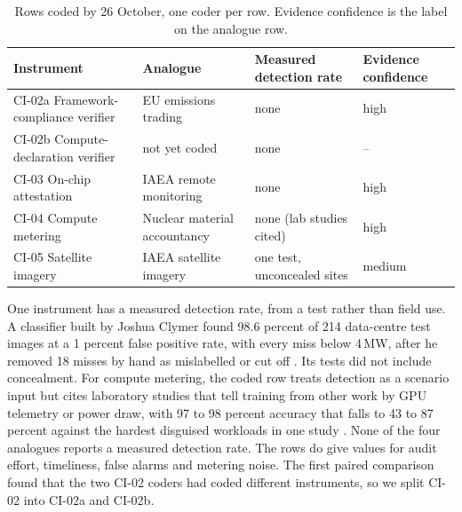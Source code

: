 \documentclass[11pt,a4paper]{article}
\begin{document}
\begin{table}[h]
\centering
\footnotesize
\begin{tabular}{@{}>{\raggedright\arraybackslash}p{4.2cm}>{\raggedright\arraybackslash}p{3.4cm}>{\raggedright\arraybackslash}p{3.2cm}l@{}}
\toprule
Instrument & Analogue & Measured detection rate & Evidence confidence \\
\midrule
CI-02a Framework-compliance verifier & EU emissions trading & none & high \\
CI-02b Compute-declaration verifier & not yet coded & none & -- \\
CI-03 On-chip attestation & IAEA remote monitoring & none & high \\
CI-04 Compute metering & Nuclear material accountancy & none (lab studies cited) & high \\
CI-05 Satellite imagery & IAEA satellite imagery & one test, unconcealed sites & medium \\
\bottomrule
\end{tabular}
\caption{Rows coded by 26 October, one coder per row. Evidence confidence is the label on the analogue row.}
\label{tab:rows}
\end{table}

One instrument has a measured detection rate, from a test rather than field use. A classifier built by Joshua Clymer found 98.6 percent of 214 data-centre test images at a 1 percent false positive rate, with every miss below 4\,MW, after he removed 18 misses by hand as mislabelled or cut off \cite{clymer}. Its tests did not include concealment. For compute metering, the coded row treats detection as a scenario input but cites laboratory studies that tell training from other work by GPU telemetry or power draw, with 97 to 98 percent accuracy that falls to 43 to 87 percent against the hardest disguised workloads in one study \cite{gargiulo2026,rahman2026}. None of the four analogues reports a measured detection rate. The rows do give values for audit effort, timeliness, false alarms and metering noise. The first paired comparison found that the two CI-02 coders had coded different instruments, so we split CI-02 into CI-02a and CI-02b.
\end{document}
